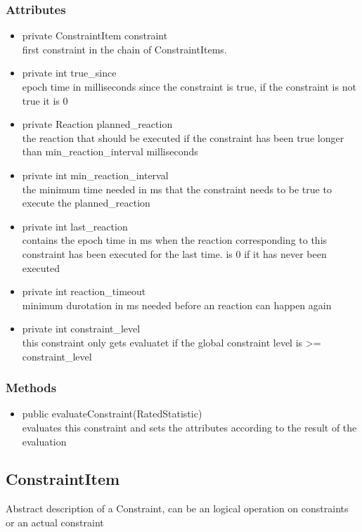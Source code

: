 \subsubsection{Attributes}
\begin{itemize}
	\item private  ConstraintItem constraint\\
	first constraint in the chain of ConstraintItems.
	\item private  int true\_since\\
	epoch time in milliseconds since the constraint is true,
	if the constraint is not true it is 0
	\item private  Reaction planned\_reaction\\
	the reaction that should be executed if the constraint has been true longer than min\_reaction\_interval milliseconds
	\item private  int min\_reaction\_interval\\
	the minimum time needed in ms that the constraint needs to be true to execute the planned\_reaction
	\item private  int last\_reaction\\
	contains the epoch time in ms when the reaction corresponding to this constraint has been executed for the last time.
		is 0 if it has never been executed
	\item private  int reaction\_timeout\\
	minimum durotation in ms needed before an reaction can happen again
	\item private  int constraint\_level\\
	this constraint only gets evaluatet if the global constraint level is >= constraint\_level
\end{itemize}
\subsubsection{Methods}
\begin{itemize}
	\item public evaluateConstraint(RatedStatistic) \\
	evaluates this constraint and sets the attributes according to the result of the evaluation
\end{itemize}



\subsection{ConstraintItem}
	Abstract description of a Constraint, can be an logical operation on constraints or an actual constraint
